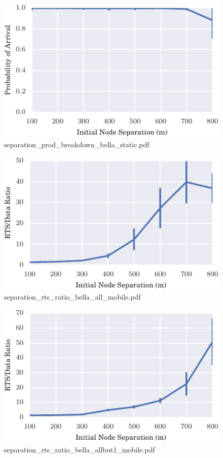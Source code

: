 \documentclass{article}
\begin{document}
\begin{figure}[h!]
\centering
\includegraphics[width=\linewidth]{separation_prod_breakdown_bella_static.pdf}
\caption{separation\_prod\_breakdown\_bella\_static.pdf}
\end{figure}




\begin{figure}[h!]
\centering
\includegraphics[width=\linewidth]{separation_rts_ratio_bella_all_mobile.pdf}
\caption{separation\_rts\_ratio\_bella\_all\_mobile.pdf}
\end{figure}




\begin{figure}[h!]
\centering
\includegraphics[width=\linewidth]{separation_rts_ratio_bella_allbut1_mobile.pdf}
\caption{separation\_rts\_ratio\_bella\_allbut1\_mobile.pdf}
\end{figure}
\end{document}
